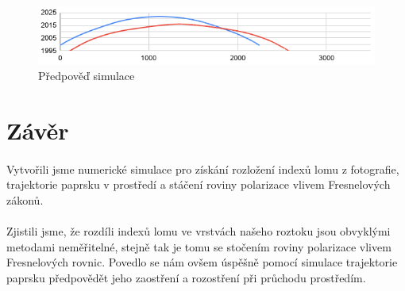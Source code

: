 \documentclass[10pt,a4paper]{article}
\begin{document}
\begin{figure}[H]
\centering
    \includegraphics[width=\textwidth]{sbihavygraf.png}
    \caption{Předpověď simulace}
    \label{fig:chart1}
\end{figure}


\section{Závěr}

\paragraph{}
Vytvořili jsme numerické simulace pro získání rozložení indexů lomu z fotografie, trajektorie paprsku v prostředí a stáčení roviny polarizace vlivem Fresnelových zákonů. 
\paragraph{}
    Zjistili jsme, že rozdíli indexů lomu ve vrstvách našeho roztoku jsou obvyklými metodami neměřitelné, stejně tak je tomu se stočením roviny polarizace vlivem Fresnelových rovnic. Povedlo se nám ovšem úspěšně pomocí simulace trajektorie paprsku předpovědět jeho zaostření a rozostření při průchodu prostředím.
\end{document}
